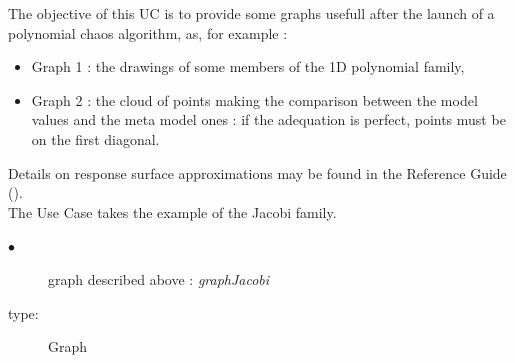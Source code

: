 \renewcommand{\filename}{docUC_RespSurface_PolyChaosDrawings.tex}
\renewcommand{\filetitle}{UC : Draw some usefull graphs associated to a polynomial chaos algorithm : polynomial graphs, comparison graph between numerical samples from the model and the meta-model, ...}

\HeaderIIILevel




The objective of this UC is to provide some graphs usefull after the launch of a polynomial chaos algorithm, as, for example :
\begin{itemize}
\item Graph 1 : the drawings of some members of the 1D polynomial family,
\item Graph 2 : the cloud of points making the comparison between the model values and the meta model ones : if the adequation is perfect, points must be on the first diagonal.
\end{itemize}


Details on response surface approximations may be found in the Reference Guide ().\\
The Use Case takes the example of the Jacobi family.\\

             {
               \begin{description}
               \item[$\bullet$] graph described above : {\itshape graphJacobi}
               \item[type:] Graph
               \end{description}
             }


